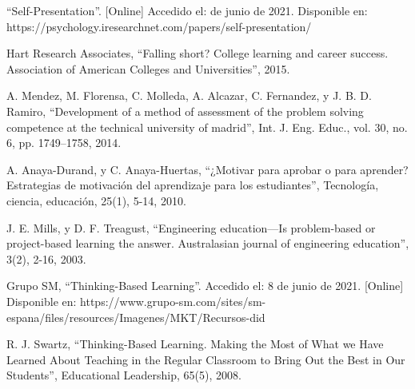 \documentclass[conference]{IEEEtran}
\begin{document}
\begin{thebibliography}{00}
 ``Self-Presentation''. [Online] Accedido el:  de junio de 2021. Disponible en: https://psychology.iresearchnet.com/papers/self-presentation/

 Hart Research Associates, ``Falling short? College learning and career success. Association of American Colleges and Universities'', 2015.

  A. Mendez, M. Florensa, C. Molleda, A. Alcazar, C. Fernandez, y J. B. D. Ramiro, ``Development of a method of assessment of the problem solving competence at the technical university of madrid'', Int. J. Eng. Educ., vol. 30, no. 6, pp. 1749--1758, 2014.

 A. Anaya-Durand, y C. Anaya-Huertas, ``¿Motivar para aprobar o para aprender? Estrategias de motivación del aprendizaje para los estudiantes'', Tecnología, ciencia, educación, 25(1), 5-14, 2010.

 J. E. Mills, y D. F. Treagust, ``Engineering education---Is problem-based or project-based learning the answer. Australasian journal of engineering education'', 3(2), 2-16, 2003.

 Grupo SM, ``Thinking-Based Learning''. Accedido el: 8 de junio de 2021.  [Online] Disponible en: https://www.grupo-sm.com/sites/sm-espana/files/resources/Imagenes/MKT/Recursos-did%

 R. J. Swartz, ``Thinking-Based Learning. Making the Most of What we Have Learned About Teaching in the Regular Classroom to Bring Out the Best in Our Students'', Educational Leadership, 65(5), 2008.


\end{thebibliography}
\vspace{12pt}
\end{document}
